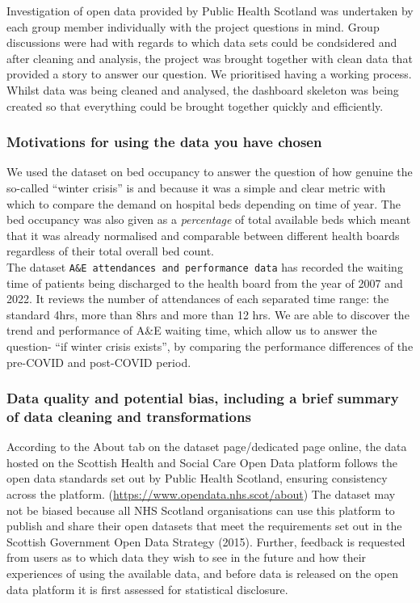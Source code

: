 \documentclass[
]{article}
\begin{document}
Investigation of open data provided by Public Health Scotland was
undertaken by each group member individually with the project questions
in mind. Group discussions were had with regards to which data sets
could be condsidered and after cleaning and analysis, the project was
brought together with clean data that provided a story to answer our
question. We prioritised having a working process. Whilst data was being
cleaned and analysed, the dashboard skeleton was being created so that
everything could be brought together quickly and efficiently.

\hypertarget{motivations-for-using-the-data-you-have-chosen}{%
\subsubsection{Motivations for using the data you have
chosen}\label{motivations-for-using-the-data-you-have-chosen}}

We used the dataset on bed occupancy to answer the question of how
genuine the so-called ``winter crisis'' is and because it was a simple
and clear metric with which to compare the demand on hospital beds
depending on time of year. The bed occupancy was also given as a
\emph{percentage} of total available beds which meant that it was
already normalised and comparable between different health boards
regardless of their total overall bed count. \\
The dataset \texttt{A\&E\ attendances\ and\ performance\ data} has
recorded the waiting time of patients being discharged to the health
board from the year of 2007 and 2022. It reviews the number of
attendances of each separated time range: the standard 4hrs, more than
8hrs and more than 12 hrs. We are able to discover the trend and
performance of A\&E waiting time, which allow us to answer the question-
``if winter crisis exists'', by comparing the performance differences of
the pre-COVID and post-COVID period.

\hypertarget{data-quality-and-potential-bias-including-a-brief-summary-of-data-cleaning-and-transformations}{%
\subsubsection{Data quality and potential bias, including a brief
summary of data cleaning and
transformations}\label{data-quality-and-potential-bias-including-a-brief-summary-of-data-cleaning-and-transformations}}

According to the About tab on the dataset page/dedicated page online,
the data hosted on the Scottish Health and Social Care Open Data
platform follows the open data standards set out by Public Health
Scotland, ensuring consistency across the platform.
(\url{https://www.opendata.nhs.scot/about}) The dataset may not be
biased because all NHS Scotland organisations can use this platform to
publish and share their open datasets that meet the requirements set out
in the Scottish Government Open Data Strategy (2015). Further, feedback
is requested from users as to which data they wish to see in the future
and how their experiences of using the available data, and before data
is released on the open data platform it is first assessed for
statistical disclosure.
\end{document}
